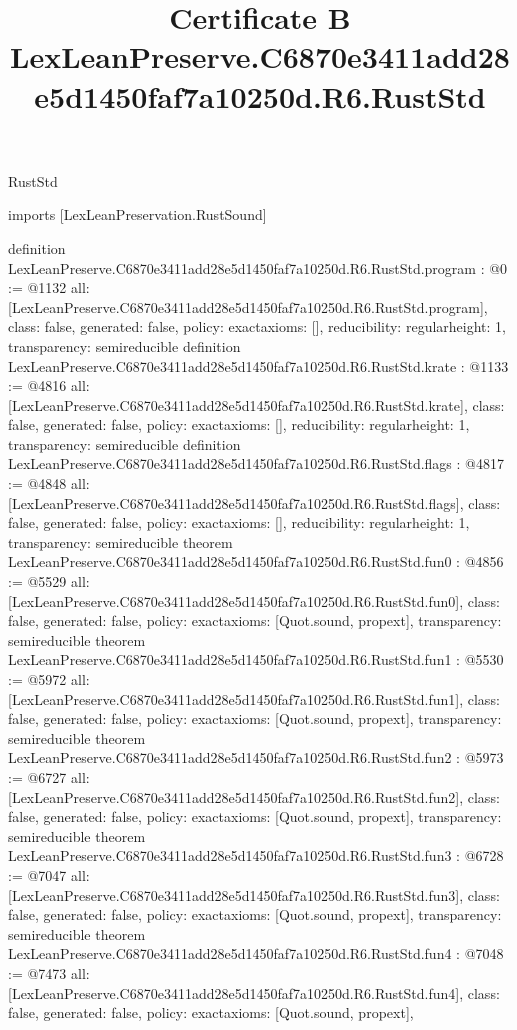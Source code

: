 \begin{lexlean}{RustStd}
\title{Certificate B LexLeanPreserve.C6870e3411add28e5d1450faf7a10250d.R6.RustStd}
\begin{coremodule}
imports [LexLeanPreservation.RustSound]

definition LexLeanPreserve.C6870e3411add28e5d1450faf7a10250d.R6.RustStd.program : @0 := @1132 {
  all: [LexLeanPreserve.C6870e3411add28e5d1450faf7a10250d.R6.RustStd.program],
  class: false,
  generated: false,
  policy: exact{axioms: []},
  reducibility: regular{height: 1},
  transparency: semireducible
}
definition LexLeanPreserve.C6870e3411add28e5d1450faf7a10250d.R6.RustStd.krate : @1133 := @4816 {
  all: [LexLeanPreserve.C6870e3411add28e5d1450faf7a10250d.R6.RustStd.krate],
  class: false,
  generated: false,
  policy: exact{axioms: []},
  reducibility: regular{height: 1},
  transparency: semireducible
}
definition LexLeanPreserve.C6870e3411add28e5d1450faf7a10250d.R6.RustStd.flags : @4817 := @4848 {
  all: [LexLeanPreserve.C6870e3411add28e5d1450faf7a10250d.R6.RustStd.flags],
  class: false,
  generated: false,
  policy: exact{axioms: []},
  reducibility: regular{height: 1},
  transparency: semireducible
}
theorem LexLeanPreserve.C6870e3411add28e5d1450faf7a10250d.R6.RustStd.fun0 : @4856 := @5529 {
  all: [LexLeanPreserve.C6870e3411add28e5d1450faf7a10250d.R6.RustStd.fun0],
  class: false,
  generated: false,
  policy: exact{axioms: [Quot.sound, propext]},
  transparency: semireducible
}
theorem LexLeanPreserve.C6870e3411add28e5d1450faf7a10250d.R6.RustStd.fun1 : @5530 := @5972 {
  all: [LexLeanPreserve.C6870e3411add28e5d1450faf7a10250d.R6.RustStd.fun1],
  class: false,
  generated: false,
  policy: exact{axioms: [Quot.sound, propext]},
  transparency: semireducible
}
theorem LexLeanPreserve.C6870e3411add28e5d1450faf7a10250d.R6.RustStd.fun2 : @5973 := @6727 {
  all: [LexLeanPreserve.C6870e3411add28e5d1450faf7a10250d.R6.RustStd.fun2],
  class: false,
  generated: false,
  policy: exact{axioms: [Quot.sound, propext]},
  transparency: semireducible
}
theorem LexLeanPreserve.C6870e3411add28e5d1450faf7a10250d.R6.RustStd.fun3 : @6728 := @7047 {
  all: [LexLeanPreserve.C6870e3411add28e5d1450faf7a10250d.R6.RustStd.fun3],
  class: false,
  generated: false,
  policy: exact{axioms: [Quot.sound, propext]},
  transparency: semireducible
}
theorem LexLeanPreserve.C6870e3411add28e5d1450faf7a10250d.R6.RustStd.fun4 : @7048 := @7473 {
  all: [LexLeanPreserve.C6870e3411add28e5d1450faf7a10250d.R6.RustStd.fun4],
  class: false,
  generated: false,
  policy: exact{axioms: [Quot.sound, propext]},
}
\end{coremodule}
\end{lexlean}
